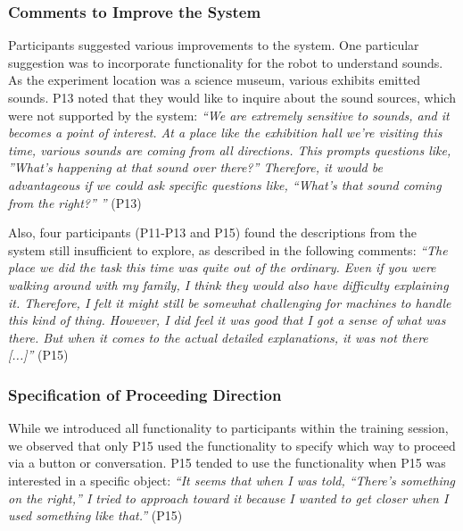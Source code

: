 \subsubsection{Comments to Improve the System}
\label{sec:improve}
Participants suggested various improvements to the system.
One particular suggestion was to incorporate functionality for the robot to understand sounds. 
As the experiment location was a science museum, various exhibits emitted sounds.
P13 noted that they would like to inquire about the sound sources, which were not supported by the system:
\newanswer[\label{P13Sound}]\textit{``We are extremely sensitive to sounds, and it becomes a point of interest. At a place like the exhibition hall we're visiting this time, various sounds are coming from all directions. This prompts questions like, ''What's happening at that sound over there?'' Therefore, it would be advantageous if we could ask specific questions like, ``What's that sound coming from the right?'' ''} (P13)

Also, four participants (P11-P13 and P15) found the descriptions from the system still insufficient to explore, as described in the following comments:
\newanswer[\label{P15Insufficient}]\textit{``The place we did the task this time was quite out of the ordinary. Even if you were walking around with my family, I think they would also have difficulty explaining it. Therefore, I felt it might still be somewhat challenging for machines to handle this kind of thing. However, I did feel it was good that I got a sense of what was there. But when it comes to the actual detailed explanations, it was not there [...]''} (P15)

\subsubsection{Specification of Proceeding Direction}
While we introduced all functionality to participants within the training session, we observed that only P15 used the functionality to specify which way to proceed via a button or conversation.
P15 tended to use the functionality when P15 was interested in a specific object:
\newanswer[\label{P15DirectionSpecification}]\textit{``It seems that when I was told, ``There's something on the right,'' I tried to approach toward it because I wanted to get closer when I used something like that.''} (P15)